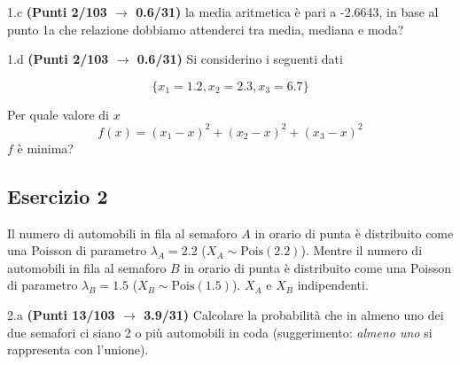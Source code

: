 \documentclass[
  11pt,
]{book}
\theoremstyle{mytheoremstyle}
\theoremstyle{mydefstyle}
\begin{document}
1.c \textbf{(Punti 2/103 \(\rightarrow\) 0.6/31)} la media aritmetica è pari a -2.6643, in base al punto 1a che relazione dobbiamo attenderci tra media, mediana e moda?

1.d \textbf{(Punti 2/103 \(\rightarrow\) 0.6/31)} Si considerino i seguenti dati

\[
\{x_1=1.2,x_2=2.3,x_3=6.7\}
\]

Per quale valore di \(x\)
\[
f(x)=(x_1-x)^2+(x_2-x)^2+(x_3-x)^2
\]
\(f\) è minima?

\subsection{Esercizio 2}\label{esercizio-2-31}

Il numero di automobili in fila al semaforo \(A\) in orario di punta è distribuito come una
Poisson di parametro \(\lambda_A=2.2\) (\(X_A\sim \text{Pois}(2.2)\)).
Mentre il numero di automobili in fila al semaforo \(B\) in orario di punta è distribuito come una
Poisson di parametro \(\lambda_B=1.5\) (\(X_B\sim \text{Pois}(1.5)\)). \(X_A\) e \(X_B\) indipendenti.

2.a \textbf{(Punti 13/103 \(\rightarrow\) 3.9/31)} Calcolare la probabilità che in almeno uno dei due semafori ci siano 2 o più automobili in coda (suggerimento: \emph{almeno uno} si rappresenta con l'unione).
\end{document}
